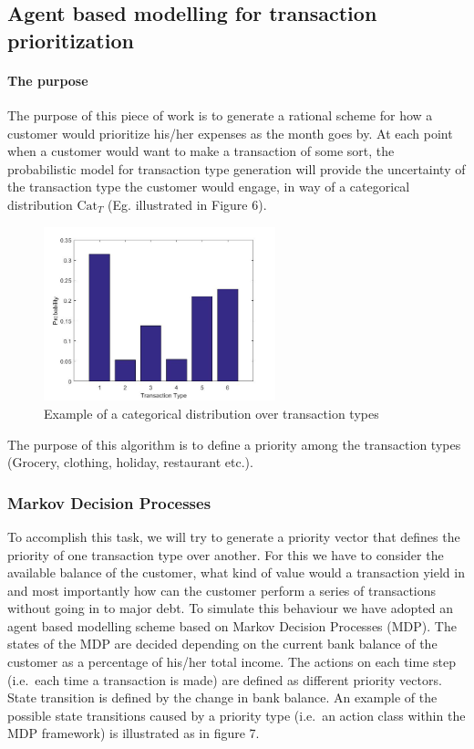 \documentclass[]{article}
\begin{document}
\subsection{Agent based modelling for transaction
prioritization}\label{agent-based-modelling-for-transaction-prioritization}

\paragraph{The purpose}\label{the-purpose}

The purpose of this piece of work is to generate a rational scheme for
how a customer would prioritize his/her expenses as the month goes by.
At each point when a customer would want to make a transaction of some
sort, the probabilistic model for transaction type generation will
provide the uncertainty of the transaction type the customer would
engage, in way of a categorical distribution $\text{Cat}_T$ (Eg. illustrated in
Figure 6).
\begin{figure}
\centering
\includegraphics[width=0.6\textwidth]{uploads/upload_f2d5f8e5757a86ec73e739eb5600af0a.jpg}
\caption{Example of a categorical distribution over transaction types}
\end{figure}

The purpose of this algorithm is to define a priority among the
transaction types (Grocery, clothing, holiday, restaurant etc.).

\subsubsection{Markov Decision
Processes}\label{markov-decision-processes}

To accomplish this task, we will try to generate a priority vector that
defines the priority of one transaction type over another. For this we
have to consider the available balance of the customer, what kind of
value would a transaction yield in and most importantly how can the
customer perform a series of transactions without going in to major
debt. To simulate this behaviour we have adopted an agent based
modelling scheme based on Markov Decision Processes (MDP). The states of
the MDP are decided depending on the current bank balance of the
customer as a percentage of his/her total income. The actions on each
time step (i.e.~each time a transaction is made) are defined as
different priority vectors. State transition is defined by the change in
bank balance. An example of the possible state transitions caused by a
priority type (i.e.~an action class within the MDP framework) is
illustrated as in figure 7.
\end{document}
